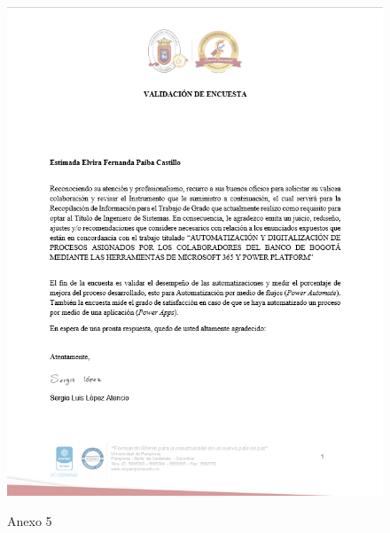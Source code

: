 \begin{figure}[H]
	\centering
	\includegraphics[scale=0.4]{Capitulo6/5}
	\label{anexo5}
	\caption{Anexo 5}
\end{figure}

